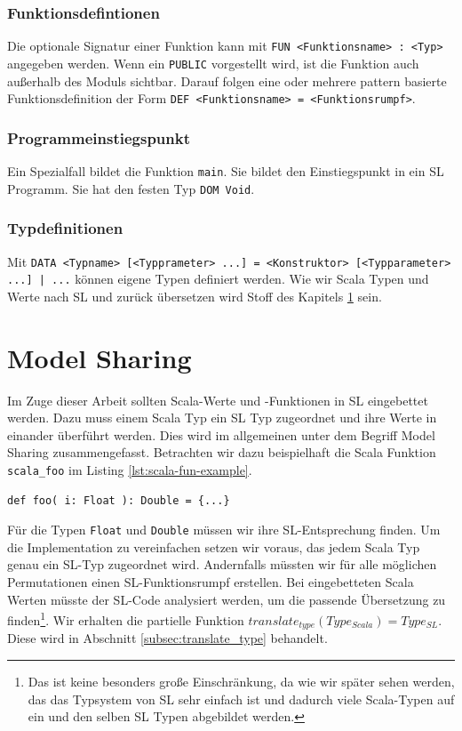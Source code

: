 \documentclass[12pt,bibtotoc]{scrreprt}
\begin{document}
\subsection{Funktionsdefintionen}

Die optionale Signatur einer Funktion kann mit \lstinline!FUN <Funktionsname> : <Typ>! angegeben werden. Wenn ein \lstinline!PUBLIC! vorgestellt wird, ist die Funktion auch außerhalb des Moduls sichtbar. Darauf folgen eine oder mehrere pattern basierte Funktionsdefinition der Form \lstinline!DEF <Funktionsname> = <Funktionsrumpf>!.


\subsection{Programmeinstiegspunkt}

Ein Spezialfall bildet die Funktion \lstinline!main!. Sie bildet den Einstiegspunkt in ein \ac{SL} Programm. Sie hat den festen Typ \lstinline!DOM Void!. 

\subsection{Typdefinitionen}

Mit \lstinline!DATA <Typname> [<Typprameter> ...] = <Konstruktor> [<Typparameter> ...] | ...! können eigene Typen definiert werden. Wie wir Scala Typen und Werte nach \ac{SL} und zurück übersetzen wird Stoff des Kapitels \ref{cha:model-sharing} sein.

\chapter{Model Sharing}
\label{cha:model-sharing}

Im Zuge dieser Arbeit sollten Scala-Werte und -Funktionen in SL eingebettet werden. Dazu muss einem Scala Typ ein SL Typ zugeordnet und ihre Werte in einander überführt werden. Dies wird im allgemeinen unter dem Begriff Model Sharing zusammengefasst.
Betrachten wir dazu beispielhaft die Scala Funktion \lstinline!scala_foo! im Listing \ref{lst:scala-fun-example}.

\begin{lstlisting}[caption=Beispielfunktion scala\_foo, label=lst:scala-fun-example]
def foo( i: Float ): Double = {...}
\end{lstlisting}

Für die Typen \lstinline!Float! und \lstinline!Double! müssen wir ihre \ac{SL}-Entsprechung finden. Um die Implementation zu vereinfachen setzen wir voraus, das jedem Scala Typ genau ein \ac{SL}-Typ zugeordnet wird. Andernfalls müssten wir für alle möglichen Permutationen einen \ac{SL}-Funktionsrumpf erstellen. Bei eingebetteten Scala Werten müsste der SL-Code analysiert werden, um die passende Übersetzung zu finden\footnote{Das ist keine besonders große Einschränkung, da wie wir später sehen werden, das das Typsystem von SL sehr einfach ist und dadurch viele Scala-Typen auf ein und den selben SL Typen abgebildet werden. }. Wir erhalten die partielle Funktion $translate_{type}(Type_{Scala}) = Type_{SL}$. Diese wird in Abschnitt \ref{subsec:translate_type} behandelt.
\end{document}
